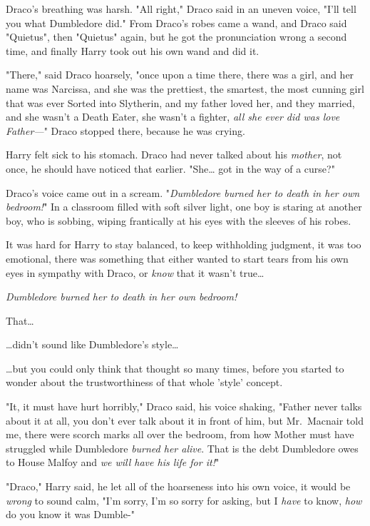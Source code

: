 Draco's breathing was harsh. "All right," Draco said in an uneven voice, "I'll 
tell you what Dumbledore did." From Draco's robes came a wand, and Draco said 
"Quietus", then "Quietus" again, but he got the pronunciation wrong a second 
time, and finally Harry took out his own wand and did it.

"There," said Draco hoarsely, "once upon a time there, there was a girl, and 
her name was Narcissa, and she was the prettiest, the smartest, the most 
cunning girl that was ever Sorted into Slytherin, and my father loved her, and 
they married, and she wasn't a Death Eater, she wasn't a fighter, \emph{all she 
ever did was love Father---}" Draco stopped there, because he was crying.

Harry felt sick to his stomach. Draco had never talked about his \emph{mother}, 
not once, he should have noticed that earlier. "She{\ldots} got in the way of a 
curse?"

Draco's voice came out in a scream. "\emph{Dumbledore burned her to death in 
her own bedroom!}"
\sbreak
In a classroom filled with soft silver light, one boy is staring at another 
boy, who is sobbing, wiping frantically at his eyes with the sleeves of his 
robes.

It was hard for Harry to stay balanced, to keep withholding judgment, it was 
too emotional, there was something that either wanted to start tears from his 
own eyes in sympathy with Draco, or \emph{know} that it wasn't true{\ldots}

\emph{Dumbledore burned her to death in her own bedroom!}

That{\ldots}

{\ldots}didn't sound like Dumbledore's style{\ldots}

{\ldots}but you could only think that thought so many times, before you started 
to wonder about the trustworthiness of that whole 'style' concept.

"It, it must have hurt horribly," Draco said, his voice shaking, "Father never 
talks about it at all, you don't ever talk about it in front of him, but 
Mr.~Macnair told me, there were scorch marks all over the bedroom, from how 
Mother must have struggled while Dumbledore \emph{burned her alive}. That is 
the debt Dumbledore owes to House Malfoy and \emph{we will have his life for 
it!}"

"Draco," Harry said, he let all of the hoarseness into his own voice, it would 
be \emph{wrong} to sound calm, "I'm sorry, I'm so sorry for asking, but I 
\emph{have} to know, \emph{how} do you know it was Dumble-"

